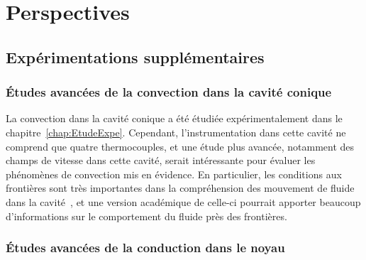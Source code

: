 %
%
%
%
%
%



\section{Perspectives}



\subsection{Expérimentations supplémentaires}

\subsubsection{\'Etudes avancées de la convection dans la cavité conique}
La convection dans la cavité conique a été étudiée expérimentalement dans le chapitre~\ref{chap:EtudeExpe}. Cependant, l'instrumentation dans cette cavité ne comprend que quatre thermocouples, et une étude plus avancée, notamment des champs de vitesse dans cette cavité, serait intéressante pour évaluer les phénomènes de convection mis en évidence. En particulier, les conditions aux frontières sont très importantes dans la compréhension des mouvement de fluide dans la cavité~\cite{mergui_convection_1996}, et une version académique de celle-ci pourrait apporter beaucoup d'informations sur le comportement du fluide près des frontières.

\subsubsection{\'Etudes avancées de la conduction dans le noyau}
